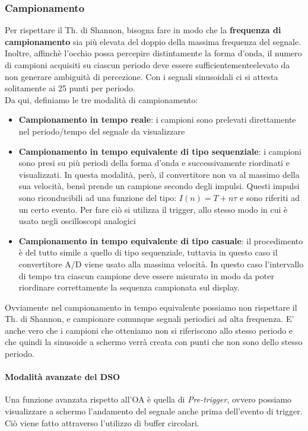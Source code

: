 \documentclass{article}
\begin{document}
	\subsubsection*{Campionamento}
	Per rispettare il Th. di Shannon, bisogna fare in modo che la \textbf{frequenza di campionamento} sia più elevata del doppio della massima frequenza del segnale.\\ Inoltre, affinchè l'occhio possa percepire distintamente la forma d'onda, il numero di campioni acquisiti su ciascun periodo deve essere sufficientementeelevato da non generare ambiguità di percezione. Con i segnali sinusoidali ci si attesta solitamente ai 25 punti per periodo.\\
	Da qui, definiamo le tre modalità di campionamento:
	\begin{itemize}
		\item \textbf{Campionamento in tempo reale}: i campioni sono prelevati direttamente nel periodo/tempo del segnale da visualizzare
		\item \textbf{Campionamento in tempo equivalente di tipo sequenziale}: i campioni sono presi su più periodi della forma d'onda e successivamente riordinati e visualizzati. In questa modalità, però, il convertitore non va al massimo della sua velocità, bensì prende un campione secondo degli impulsi. Questi impulsi sono riconducibili ad una funzione del tipo: $I(n) = T + n\tau$ e sono riferiti ad un certo evento. Per fare ciò si utilizza il trigger, allo stesso modo in cui è usato negli oscilloscopi analogici
		\item \textbf{Campionamento in tempo equivalente di tipo casuale}: il procedimento è del tutto simile a quello di tipo sequenziale, tuttavia in questo caso il convertitore A/D viene usato alla massima velocità. In questo caso l'intervallo di tempo tra ciascun campione deve essere misurato in modo da poter riordinare correttamente la sequenza campionata sul display.
	\end{itemize}
	Ovviamente nel campionamento in tempo equivalente possiamo non rispettare il Th. di Shannon, e campionare comunque segnali periodici ad alta frequenza. E' anche vero che i campioni che otteniamo non si riferiscono allo stesso periodo e che quindi la sinusoide a schermo verrà creata con punti che non sono dello stesso periodo.
	\paragraph*{Modalità avanzate del DSO}
	Una funzione avanzata rispetto all'OA è quella di \textit{Pre-trigger}, ovvero possiamo visualizzare a schermo l'andamento del segnale anche prima dell'evento di trigger. Ciò viene fatto attraverso l'utilizzo di buffer circolari.
\end{document}

